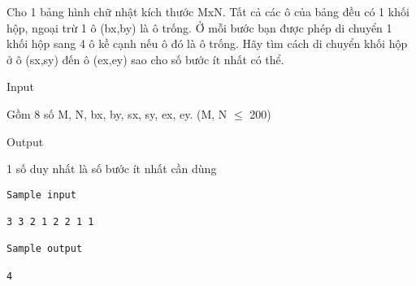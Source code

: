 

Cho 1 bảng hình chữ nhật kích thước MxN. Tất cả các ô của bảng đều có 1 khối hộp, ngoại trừ 1 ô (bx,by) là ô trống. Ở mỗi bước bạn được phép di chuyển 1 khối hộp sang 4 ô kề cạnh nếu ô đó là ô trống. Hãy tìm cách di chuyển khối hộp ở ô (sx,sy) đến ô (ex,ey) sao cho số bước ít nhất có thể.

Input

Gồm 8 số M, N, bx, by, sx, sy, ex, ey. (M, N  $\le$  200)

Output

1 số duy nhất là số bước ít nhất cần dùng
\begin{verbatim}
Sample input

3 3 2 1 2 2 1 1

Sample output

4\end{verbatim}
